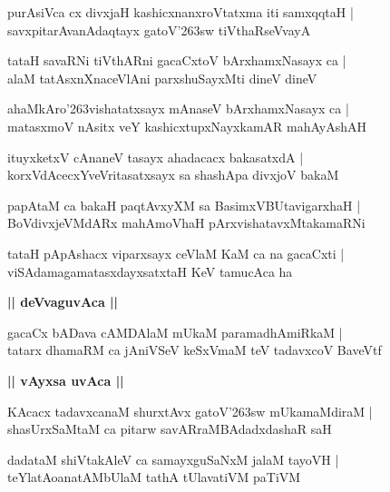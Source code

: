 \documentclass[twoside,12pt,openright]{book}
\def\S{\char'263}
\newcounter{shloka}[chapter]
\def\uvaca#1{\centerline{{\large\textbf{#1}}}}
\begin{document}
\begin{shloka}%
purAsiVca cx divxjaH kashicxnanxroVtatxma iti samxqqtaH |\\
savxpitarAvanAdaqtayx gatoV\S sw tiVthaRseVvayA 
\end{shloka}

\begin{shloka}%
tataH savaRNi tiVthARni gacaCxtoV bArxhamxNasayx ca |\\
alaM tatAsxnXnaceVlAni parxshuSayxMti dineV dineV 
\end{shloka}

\begin{shloka}%
ahaMkAro\S vishatatxsayx mAnaseV bArxhamxNasayx ca |\\
matasxmoV nAsitx veY kashicxtupxNayxkamAR mahAyAshAH 
\end{shloka}

\begin{shloka}%
ituyxketxV cAnaneV tasayx ahadacacx bakasatxdA |\\
korxVdAcecxYveVritasatxsayx sa shashApa divxjoV bakaM 
\end{shloka}

\begin{shloka}%
papAtaM ca bakaH paqtAvxyXM sa BasimxVBUtavigarxhaH |\\
BoVdivxjeVMdARx mahAmoVhaH pArxvishatavxMtakamaRNi
\end{shloka}

\begin{shloka}%
tataH pApAshacx viparxsayx ceVlaM KaM ca na gacaCxti |\\
viSAdamagamatasxdayxsatxtaH KeV tamucAca ha
\end{shloka}
 
\uvaca{|| deVvaguvAca ||}
 
\begin{shloka}%
gacaCx bADava cAMDAlaM mUkaM paramadhAmiRkaM |\\
tatarx dhamaRM ca jAniVSeV keSxVmaM teV tadavxcoV BaveVtf 
\end{shloka}

\uvaca{|| vAyxsa uvAca ||}

\begin{shloka}%
KAcacx tadavxcanaM shurxtAvx gatoV\S sw mUkamaMdiraM |\\
shasUrxSaMtaM ca pitarw savARraMBAdadxdashaR saH 
\end{shloka}

\begin{shloka}%
dadataM shiVtakAleV ca samayxguSaNxM jalaM tayoVH |\\
teYlatAoanatAMbUlaM tathA tUlavatiVM paTiVM 
\end{shloka}
\end{document}
